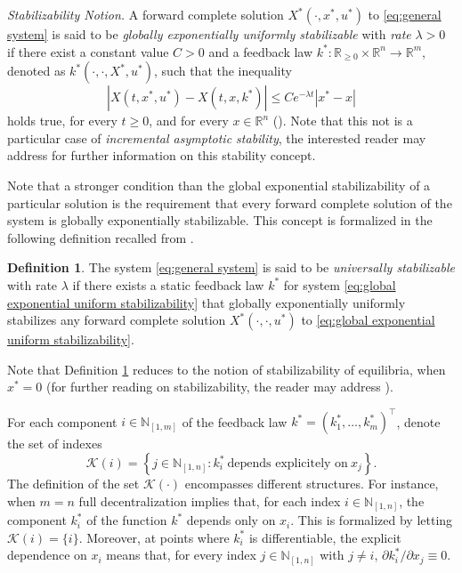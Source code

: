 \documentclass[10pt,twocolumn,twoside]{IEEEtran}
\theoremstyle{plain}
\theoremstyle{definition}
\newtheorem{definition}[theorem]{Definition}
\theoremstyle{remark}
\begin{document}
{\itshape Stabilizability Notion.} A forward complete solution $X^\ast(\cdot,x^\ast,u^\ast)$ to \eqref{eq:general system} is said to be  \emph{globally exponentially uniformly stabilizable} with \emph{rate} $\lambda>0$ if there exist a constant value $C>0$ and a feedback law $k^\ast:\mathbb{R}_{\geq0}\times\mathbb{R}^n\to\mathbb{R}^m$, denoted as $k^\ast(\cdot,\cdot,X^\ast,u^\ast)$, such that the inequality
\begin{equation}\label{eq:global exponential uniform stabilizability}
	\left|X(t,x^\ast,u^\ast)-X(t,x,k^\ast)\right|\leq Ce^{-\lambda t}|x^\ast-x|
\end{equation}
holds true, for every $t\geq0$, and for every $x\in\mathbb{R}^n$ (\cite{Manchester2014a}). Note that this not is a particular case of \emph{incremental asymptotic stability}, the interested reader may address \cite{Forni2014,Forni2014a} for further information on this stability concept.

Note that a stronger condition than the global exponential stabilizability of a particular solution is the requirement that every forward complete solution of the system is globally exponentially stabilizable. This concept is formalized in the following definition recalled from \cite{Manchester2014a}.

\begin{definition}\label{def:US}
	The system \eqref{eq:general system} is said to be \emph{universally stabilizable} with rate $\lambda$ if there exists a static feedback law $k^\ast$ for system \eqref{eq:global exponential uniform stabilizability} that globally exponentially uniformly stabilizes any forward complete solution $X^\ast(\cdot,\cdot,u^\ast)$ to \eqref{eq:global exponential uniform stabilizability}.
\end{definition}

Note that Definition \ref{def:US} reduces to the notion of stabilizability of equilibria, when $x^\ast=0$ (for further reading on stabilizability, the reader may address \cite{Bacciotti:1992}).

For each component $i\in\mathbb{N}_{[1,m]}$ of the feedback law $k^\ast=(k_1^\ast,\ldots,k_m^\ast)^\top$, denote the set of indexes
\begin{equation*}
	\mathscr{K}(i)=\left\{j\in\mathbb{N}_{[1,n]}:k_i^\ast\ \text{depends explicitely on}\ x_j \right\}.
\end{equation*}
The definition of the set $\mathscr{K}(\cdot)$ encompasses different structures. For instance, when $m=n$ full decentralization implies that, for each index $i\in\mathbb{N}_{[1,n]}$, the component $k_i^\ast$ of the function $k^\ast$ depends only on $x_i$. This is formalized by letting $\mathscr{K}(i)=\{i\}$. Moreover, at points where $k_i^\ast$ is differentiable, the explicit dependence on $x_i$ means that, for every index $j\in\mathbb{N}_{[1,n]}$ with $j\neq i$, $\partial k_i^\ast/\partial x_j\equiv0$.
\end{document}

